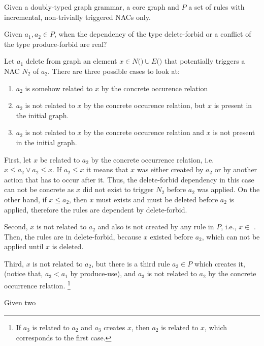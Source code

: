 \begin{definition}[Sketch] Given \doublyTypedGraphGrammarCore{} a doubly-typed graph grammar, \coreGraph{} a core graph and $P$ a set of rules with incremental, non-trivially triggered NACs only.

Given $a_1, a_2 \in P$, when the dependency of the type delete-forbid or a conflict of the type produce-forbid are real?

Let $a_1$ delete from graph \coreGraph{} an element $x \in N($\coreGraph$) \cup E($\coreGraph$)$ that potentially triggers a NAC $N_2$ of $a_2$. There are three possible cases to look at:

\begin{enumerate}
  \item $a_2$ is somehow related to $x$ by the concrete occurence relation
  \item $a_2$ is not related to $x$ by the concrete occurence relation, but $x$ is present in the initial graph.
  \item $a_2$ is not related to $x$ by the concrete occurence relation and $x$ is not present in the initial graph.
\end{enumerate}

First, let $x$ be related to $a_2$ by the concrete occurrence relation, i.e. \mbox{$x \leq a_2 \lor a_2 \leq x$}. If $a_2 \leq x$ it means that $x$ was either created by $a_2$ or by another action that has to occur after it. Thus, the delete-forbid dependency in this case can not be concrete as $x$ did not exist to trigger $N_2$ before $a_2$ was applied. On the other hand, if $x \leq a_2$, then $x$ must exists and must be deleted before $a_2$ is applied, therefore the rules are dependent by delete-forbid.

Second, $x$ is not related to $a_2$ and also is not created by any rule in $P$, i.e., $x \in$ \coreGraph{}. Then, the rules are in delete-forbid, because $x$ existed before $a_2$, which can not be applied until $x$ is deleted.

  Third, $x$ is not related to $a_2$, but there is a third rule $a_3 \in P$ which creates it, (notice that, $a_3 < a_1$ by produce-use), and $a_3$ is not related to $a_2$ by the concrete occurrence relation. \footnote{If $a_3$ is related to $a_2$ and $a_3$ creates $x$, then $a_2$ is related to $x$, which corresponds to the first case.}
\end{definition}

\begin{definition} Given two


\end{definition}

